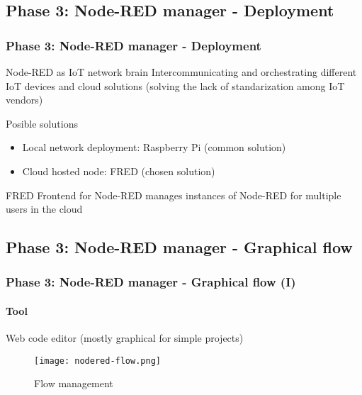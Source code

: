 \documentclass[
    aspectratio=169,                   %
]{beamer}
\begin{document}
\subsection{Phase 3: Node-RED manager - Deployment}

    \begin{frame}
        \frametitle{Phase 3: Node-RED manager - Deployment}

        \begin{block}{Node-RED as IoT network brain}
            Intercommunicating and orchestrating different IoT devices and cloud solutions (solving the lack of standarization among IoT vendors)
        \end{block}

        \begin{block}{Posible solutions}
            \begin{itemize}
                \item \alert{Local network deployment}: Raspberry Pi (common solution)
                \item \alert{Cloud hosted node}: FRED\cite{servicesFred} (chosen solution)
            \end{itemize}
        \end{block}

        \begin{block}{FRED}
            Frontend for Node-RED manages instances of Node-RED for multiple users in the cloud
        \end{block}

    \end{frame}


\subsection{Phase 3: Node-RED manager - Graphical flow}

    \begin{frame}
        \frametitle{Phase 3: Node-RED manager - Graphical flow (I)}

        \paragraph{Tool} Web code editor (mostly graphical for simple projects)

        \begin{figure}
            \centering
            \begin{stampbox}
                \texttt{[image: nodered-flow.png]}
            \end{stampbox}
            \caption{Flow management}
        \end{figure}
        
    \end{frame}
\end{document}
